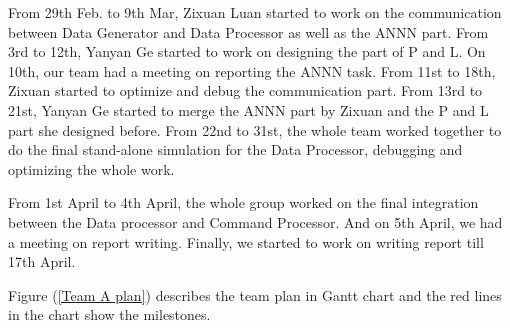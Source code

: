 \documentclass[11pt,a4paper]{report}
\begin{document}
From 29th Feb. to 9th Mar, Zixuan Luan started to work on the communication between Data Generator and Data Processor as well as the ANNN part. From 3rd to 12th, Yanyan Ge started to work on designing the part of P and L. On 10th, our team had a meeting on reporting the ANNN task. From 11st to 18th, Zixuan started to optimize and debug the communication part. From 13rd to 21st, Yanyan Ge started to merge the ANNN part by Zixuan and the P and L part she designed before. From 22nd to 31st, the whole team worked together to do the final stand-alone simulation for the Data Processor, debugging and optimizing the whole work. 

From 1st April to 4th April, the whole group worked on the final integration between the Data processor and Command Processor. And on 5th April, we had a meeting on report writing. Finally, we started to work on writing report till 17th April.

Figure (\ref{Team A plan}) describes the team plan in Gantt chart and the red lines in the chart show the milestones.
\end{document}
